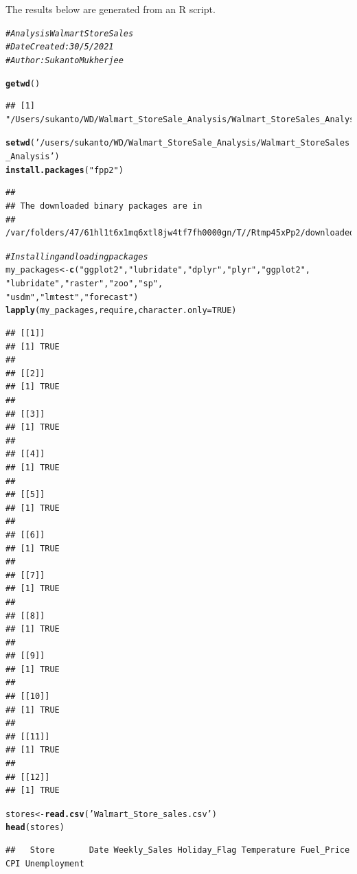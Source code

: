 \documentclass{article}\usepackage[]{graphicx}\usepackage[]{color}
\makeatletter
\newcommand{\hlnum}[1]{\textcolor[rgb]{0.686,0.059,0.569}{#1}}%
\newcommand{\hlstr}[1]{\textcolor[rgb]{0.192,0.494,0.8}{#1}}%
\newcommand{\hlcom}[1]{\textcolor[rgb]{0.678,0.584,0.686}{\textit{#1}}}%
\newcommand{\hlstd}[1]{\textcolor[rgb]{0.345,0.345,0.345}{#1}}%
\newcommand{\hlkwb}[1]{\textcolor[rgb]{0.69,0.353,0.396}{#1}}%
\newcommand{\hlkwc}[1]{\textcolor[rgb]{0.333,0.667,0.333}{#1}}%
\newcommand{\hlkwd}[1]{\textcolor[rgb]{0.737,0.353,0.396}{\textbf{#1}}}%
\newenvironment{kframe}{%
 \def\at@end@of@kframe{}%
 \ifinner\ifhmode%
  \def\at@end@of@kframe{\end{minipage}}%
  \begin{minipage}{\columnwidth}%
 \fi\fi%
 \def\FrameCommand##1{\hskip\@totalleftmargin \hskip-\fboxsep
 \colorbox{shadecolor}{##1}\hskip-\fboxsep
     \hskip-\linewidth \hskip-\@totalleftmargin \hskip\columnwidth}%
 \MakeFramed {\advance\hsize-\width
   \@totalleftmargin\z@ \linewidth\hsize
   \@setminipage}}%
 {\par\unskip\endMakeFramed%
 \at@end@of@kframe}
\newenvironment{knitrout}{}{} %
\makeatother
\begin{document}
The results below are generated from an R script.

\begin{knitrout}
\color{fgcolor}\begin{kframe}
\begin{alltt}
\hlcom{#Analysis Walmart Store Sales}
\hlcom{#Date Created: 30/5/2021}
\hlcom{#Author: Sukanto Mukherjee}

\hlkwd{getwd}\hlstd{()}
\end{alltt}
\begin{verbatim}
## [1] "/Users/sukanto/WD/Walmart_StoreSale_Analysis/Walmart_StoreSales_Analysis"
\end{verbatim}
\begin{alltt}
\hlkwd{setwd}\hlstd{(}\hlstr{'/users/sukanto/WD/Walmart_StoreSale_Analysis/Walmart_StoreSales_Analysis'}\hlstd{)}
\hlkwd{install.packages}\hlstd{(}\hlstr{"fpp2"}\hlstd{)}
\end{alltt}
\begin{verbatim}
## 
## The downloaded binary packages are in
## 	/var/folders/47/61hl1t6x1mq6xtl8jw4tf7fh0000gn/T//Rtmp45xPp2/downloaded_packages
\end{verbatim}
\begin{alltt}
\hlcom{#Installing and loading packages}
\hlstd{my_packages} \hlkwb{<-} \hlkwd{c}\hlstd{(}\hlstr{"ggplot2"}\hlstd{,}\hlstr{"lubridate"}\hlstd{,}\hlstr{"dplyr"}\hlstd{,} \hlstr{"plyr"}\hlstd{,}\hlstr{"ggplot2"}\hlstd{,}
                 \hlstr{"lubridate"}\hlstd{,}\hlstr{"raster"}\hlstd{,}\hlstr{"zoo"}\hlstd{,}\hlstr{"sp"}\hlstd{,}
                 \hlstr{"usdm"}\hlstd{,}\hlstr{"lmtest"}\hlstd{,}\hlstr{"forecast"}\hlstd{)}
\hlkwd{lapply}\hlstd{(my_packages, require,} \hlkwc{character.only} \hlstd{=} \hlnum{TRUE}\hlstd{)}
\end{alltt}
\begin{verbatim}
## [[1]]
## [1] TRUE
## 
## [[2]]
## [1] TRUE
## 
## [[3]]
## [1] TRUE
## 
## [[4]]
## [1] TRUE
## 
## [[5]]
## [1] TRUE
## 
## [[6]]
## [1] TRUE
## 
## [[7]]
## [1] TRUE
## 
## [[8]]
## [1] TRUE
## 
## [[9]]
## [1] TRUE
## 
## [[10]]
## [1] TRUE
## 
## [[11]]
## [1] TRUE
## 
## [[12]]
## [1] TRUE
\end{verbatim}
\begin{alltt}
\hlstd{stores} \hlkwb{<-} \hlkwd{read.csv}\hlstd{(}\hlstr{'Walmart_Store_sales.csv'}\hlstd{)}
\hlkwd{head}\hlstd{(stores)}
\end{alltt}
\begin{verbatim}
##   Store       Date Weekly_Sales Holiday_Flag Temperature Fuel_Price      CPI Unemployment

\end{verbatim}
\end{kframe}
\end{knitrout}
\end{document}
